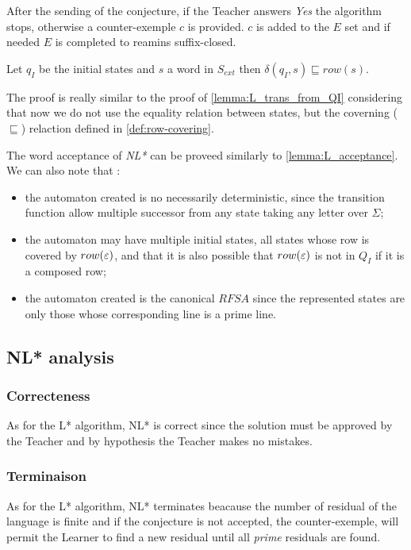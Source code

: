 After the sending of the conjecture, if the Teacher answers \textit{Yes} the algorithm stops, otherwise a counter-exemple $c$ is provided. $c$ is added to the $E$ set and if needed $E$ is completed to reamins suffix-closed.

\begin{lemma}
  Let $q_I$ be the initial states and $s $ a word in $S_{ext}$ then $\delta(q_I, s) \sqsubseteq row(s)$.
\end{lemma}

The proof is really similar to the proof of \cref{lemma:L_trans_from_QI} considering that now we do not use the equality relation between states, but the coverning ($\sqsubseteq$) relaction defined in \cref{def:row-covering}.


The word acceptance of \textit{NL*} can be proveed similarly to \cref{lemma:L_acceptance}. We can also note that :
\begin{itemize}
  \item the automaton created is no necessarily deterministic, since the transition function allow multiple successor from any state taking any letter over $\Sigma$;
  \item the automaton may have multiple initial states, all states whose row is covered by $row(\varepsilon)$, and that it is also possible that $row(\varepsilon)$ is not in $Q_I$ if it is a composed row;
  \item the automaton created is the canonical $RFSA$ since the represented states are only those whose corresponding line is a prime line.
\end{itemize}


\subsection{NL* analysis}
\subsubsection{Correcteness}
As for the L* algorithm, NL* is correct since the solution must be approved by the Teacher and by hypothesis the Teacher makes no mistakes.

\subsubsection{Terminaison}
As for the L* algorithm, NL* terminates beacause the number of residual of the language is finite and if the conjecture is not accepted, the counter-exemple, will permit the Learner to find a new residual until all \textit{prime} residuals are found.

